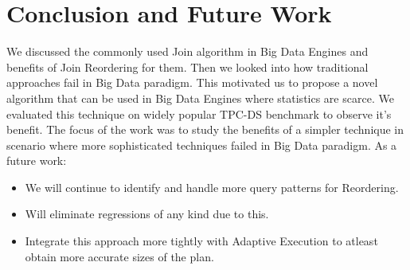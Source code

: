 \section{Conclusion and Future Work}
We discussed the commonly used Join algorithm in Big Data Engines and benefits of Join Reordering for them. Then we looked into how traditional approaches fail in Big Data paradigm. This motivated us to propose a novel algorithm that can be used in Big Data Engines where statistics are scarce. We evaluated this technique on widely popular TPC-DS benchmark to observe it's benefit. The focus of the work was to study the benefits of a simpler technique in scenario where more sophisticated techniques failed in Big Data paradigm. As a future work:

\begin{itemize}
\item We will continue to identify and handle more query patterns for Reordering.
\item Will eliminate regressions of any kind due to this. 
\item Integrate this approach more tightly with Adaptive Execution to atleast obtain more accurate sizes of the plan.
\end{itemize}


